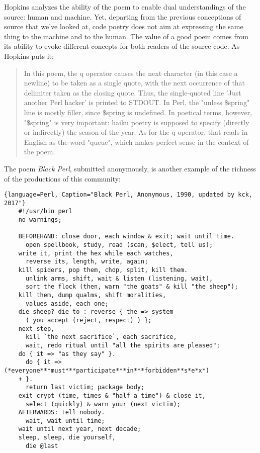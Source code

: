 Hopkins analyzes the ability of the poem to enable dual understandings of the source: human and machine. Yet, departing from the previous conceptions of source that we've looked at, code poetry does not aim at expressing the same thing to the machine and to the human. The value of a good poem comes from its ability to evoke different concepts for both readers of the source code. As Hopkins puts it:

\begin{quote}
  In this poem, the q operator causes the next character (in this case a newline) to be taken as a single quote, with
  the next occurrence of that delimiter taken as the closing quote. Thus, the single-quoted line 'Just another Perl
  hacker' is printed to STDOUT. In Perl, the "unless \$spring" line is mostly filler, since \$spring is undefined. In
  poetical terms, however, "\$spring" is very important: haiku poetry is supposed to specify (directly or indirectly) the
  season of the year. As for the q operator, that reads in English as the word "queue", which makes perfect sense in
  the context of the poem.  \cite{hopkins_camels_1992}
\end{quote}

The poem \emph{Black Perl}, submitted anonymously, is another example of the richness of the productions of this community:

\linespread{1.00}\selectfont
\begin{lstlisting}{language=Perl, Caption="Black Perl, Anonymous, 1990, updated by kck, 2017"}
    #!/usr/bin perl
    no warnings;
    
    BEFOREHAND: close door, each window & exit; wait until time.
      open spellbook, study, read (scan, $elect, tell us);
    write it, print the hex while each watches,
      reverse its, length, write, again;
    kill spiders, pop them, chop, split, kill them.
      unlink arms, shift, wait & listen (listening, wait),
      sort the flock (then, warn "the goats" & kill "the sheep");
    kill them, dump qualms, shift moralities,
      values aside, each one;
    die sheep? die to : reverse { the => system
      ( you accept (reject, respect) ) };
    next step,
      kill `the next sacrifice`, each sacrifice,
      wait, redo ritual until "all the spirits are pleased";
    do { it => "as they say" }.
      do { it => (*everyone***must***participate***in***forbidden**s*e*x*)
    + }.
      return last victim; package body;
    exit crypt (time, times & "half a time") & close it,
      select (quickly) & warn your (next victim);
    AFTERWARDS: tell nobody.
      wait, wait until time;
    wait until next year, next decade;
    sleep, sleep, die yourself,
      die @last 
\end{lstlisting}
\linespread{1.50}\selectfont
\normalfont

